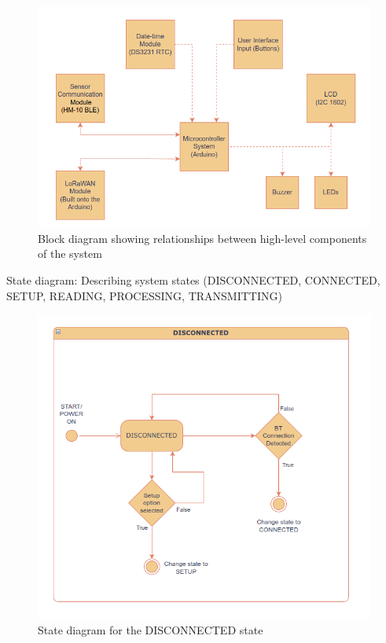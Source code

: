 \begin{figure}[H]
\centering
\includegraphics[width=\textwidth]{diagrams/block_diagram}
\caption{Block diagram showing relationships between high-level components of the system}
\label{fig:block_diagram}
\end{figure}

State diagram: Describing system states (DISCONNECTED, CONNECTED, SETUP, READING, PROCESSING, TRANSMITTING)
\begin{figure}[H]
	\centering
	\includegraphics[width=\textwidth]{diagrams/states_disconnected}
	\caption{State diagram for the DISCONNECTED state}
	\label{fig:states_disconnected}
\end{figure}

